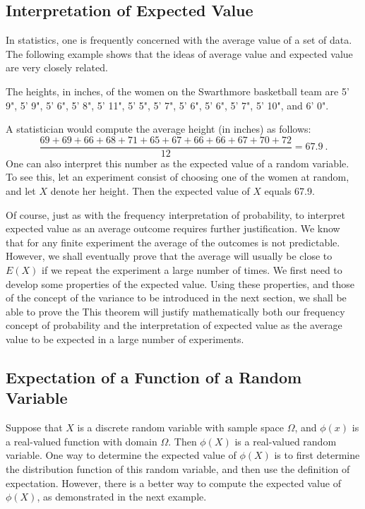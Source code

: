 \subsection*{Interpretation of Expected Value}

In statistics, one is frequently concerned with the average value of a set of data. 
The following example shows that the ideas of average value and expected value are
very closely related.

\begin{example}\label{exam 6.8.5} The heights, in inches, of the women
on the Swarthmore basketball team are 5' 9", 5' 9", 5' 6", 5' 8", 5' 11",
5' 5", 5' 7", 5' 6", 5' 6", 5' 7", 5' 10", and 6' 0". 
\par A statistician would compute the average height (in inches) as follows:
$$\frac{69 + 69 + 66 + 68 + 71 + 65 + 67 + 66 + 66 + 67 + 70 + 72}{12} = 67.9\ .$$
One can also interpret this number as the expected value
of a random variable.  To see this, let an experiment consist of choosing one of the
women at random, and let $X$ denote her height.  Then the expected
value of $X$ equals 67.9.
\end{example}

\par Of course, just as with the frequency interpretation of probability, to
interpret expected value as an average outcome requires further justification.  We
know that for any finite experiment the average of the outcomes is not predictable. 
However, we shall eventually prove that the average will usually be close to $E(X)$
if we repeat the experiment a large number of times.  We first need to develop some
properties of the expected value.  Using these properties, and those of the concept
of the variance to be introduced in the next section, we shall be able to prove the
  This theorem will justify mathematically both our
frequency concept of probability and the interpretation of expected value as the
average value to be expected in a large number of experiments.


\subsection*{Expectation of a Function of a Random Variable}

Suppose that $X$ is a discrete random variable with sample space $\Omega$, and
$\phi(x)$ is a real-valued function with domain $\Omega$.  Then $\phi(X)$ is a
real-valued random variable.  One way to determine the expected value of $\phi(X)$ is
to first determine the distribution function of this random variable, and then use
the definition of expectation. However, there is a better way to compute the expected
value of $\phi(X)$, as demonstrated in the next example.

